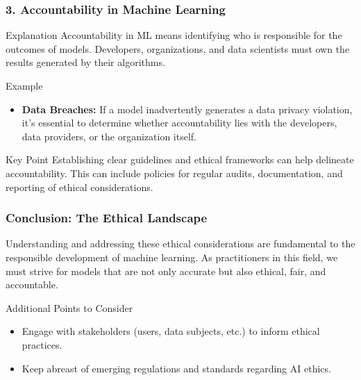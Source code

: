 \documentclass[aspectratio=169]{beamer}
\begin{document}
\begin{frame}[fragile]
    \frametitle{3. Accountability in Machine Learning}
    \begin{block}{Explanation}
        Accountability in ML means identifying who is responsible for the outcomes of models. Developers, organizations, and data scientists must own the results generated by their algorithms.
    \end{block}
    
    \begin{block}{Example}
        \begin{itemize}
            \item \textbf{Data Breaches:} If a model inadvertently generates a data privacy violation, it’s essential to determine whether accountability lies with the developers, data providers, or the organization itself.
        \end{itemize}
    \end{block}

    \begin{block}{Key Point}
        Establishing clear guidelines and ethical frameworks can help delineate accountability. This can include policies for regular audits, documentation, and reporting of ethical considerations.
    \end{block}
\end{frame}

\begin{frame}[fragile]
    \frametitle{Conclusion: The Ethical Landscape}
    Understanding and addressing these ethical considerations are fundamental to the responsible development of machine learning. As practitioners in this field, we must strive for models that are not only accurate but also ethical, fair, and accountable.
    
    \begin{block}{Additional Points to Consider}
        \begin{itemize}
            \item Engage with stakeholders (users, data subjects, etc.) to inform ethical practices.
            \item Keep abreast of emerging regulations and standards regarding AI ethics.
        \end{itemize}
    \end{block}
\end{frame}
\end{document}
